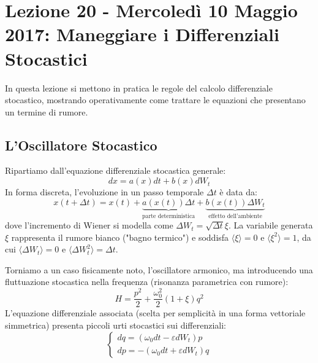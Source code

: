 \documentclass[12pt,a4paper]{article}
\begin{document}
\section{Lezione 20 - Mercoledì 10 Maggio 2017: Maneggiare i Differenziali Stocastici}

In questa lezione si mettono in pratica le regole del calcolo differenziale stocastico, mostrando operativamente come trattare le equazioni che presentano un termine di rumore.

\subsection{L'Oscillatore Stocastico}
Ripartiamo dall'equazione differenziale stocastica generale:
\begin{equation}
dx = a(x)dt + b(x)dW_t
\end{equation}
In forma discreta, l'evoluzione in un passo temporale $\Delta t$ è data da:
\begin{equation}
x(t+\Delta t) = x(t) + \underbrace{a(x(t))\Delta t}_{\text{parte deterministica}} + \underbrace{b(x(t))\Delta W_t}_{\text{effetto dell'ambiente}}
\end{equation}
dove l'incremento di Wiener si modella come $\Delta W_t = \sqrt{\Delta t}\xi$. La variabile generata $\xi$ rappresenta il rumore bianco ("bagno termico") e soddisfa $\langle \xi \rangle = 0$ e $\langle \xi^2 \rangle = 1$, da cui $\langle \Delta W_t \rangle = 0$ e $\langle \Delta W_t^2 \rangle = \Delta t$.

Torniamo a un caso fisicamente noto, l'oscillatore armonico, ma introducendo una fluttuazione stocastica nella frequenza (risonanza parametrica con rumore):
\begin{equation}
H = \frac{p^2}{2} + \frac{\omega_0^2}{2}(1+\xi)q^2
\end{equation}
L'equazione differenziale associata (scelta per semplicità in una forma vettoriale simmetrica) presenta piccoli urti stocastici sui differenziali:
\begin{equation}
\begin{cases}
dq = (\omega_0 dt - \varepsilon dW_t)p \\
dp = -(\omega_0 dt + \varepsilon dW_t)q
\end{cases}
\end{equation}
\end{document}
